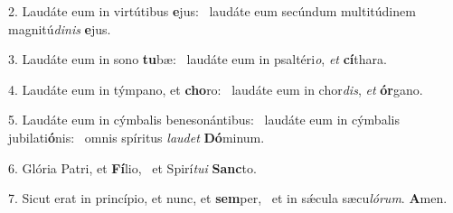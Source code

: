 2. Laudáte eum in virtútibus \textbf{e}jus: \ast\  laudáte eum secúndum multitúdinem magnitú\textit{di}\textit{nis} \textbf{e}jus.\

3. Laudáte eum in sono \textbf{tu}bæ: \ast\  laudáte eum in psaltéri\textit{o}, \textit{et} \textbf{cí}thara.\

4. Laudáte eum in týmpano, et \textbf{cho}ro: \ast\  laudáte eum in chor\textit{dis}, \textit{et} \textbf{ór}gano.\

5. Laudáte eum in cýmbalis benesonántibus: \dag\  laudáte eum in cýmbalis jubilati\textbf{ó}nis: \ast\  omnis spíritus \textit{lau}\textit{det} \textbf{Dó}minum.\

6. Glória Patri, et \textbf{Fí}lio, \ast\  et Spirí\textit{tu}\textit{i} \textbf{Sanc}to.\

7. Sicut erat in princípio, et nunc, et \textbf{sem}per, \ast\  et in sǽcula sæcu\textit{ló}\textit{rum}. \textbf{A}men.\

